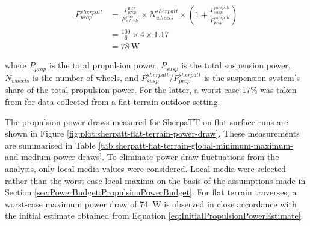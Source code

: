 \begin{align}
  \label{eq:InitialPropulsionPowerEstimate}
  P_{prop}^{sherpatt} &= \frac{P_{prop}^{mer}}{N_{wheels}^{mer}} \times N_{wheels}^{sherpatt} \times \left(1 +\frac{P_{susp}^{sherpatt}}{P_{prop}^{sherpatt}}\right) \\
           &= \frac{100}{6} \times 4 \times 1.17\\
           &= \SI{78}{\watt}
\end{align}


where $P_{prop}$ is the total propulsion power, $P_{susp}$ is the total suspension power, $N_{wheels}$ is the number of wheels, and $P_{susp}^{sherpatt} / P_{prop}^{sherpatt}$ is the suspension system's share of the total propulsion power. For the latter, a worst-case 17\% was taken from  for data collected from a flat terrain outdoor setting.

The propulsion power draws measured for SherpaTT on flat surface runs are shown in Figure \ref{fig:plot:sherpatt-flat-terrain-power-draw}. These measurements are summarised in Table \ref{tab:sherpatt-flat-terrain-global-minimum-maximum-and-medium-power-draws}. To eliminate power draw fluctuations from the analysis, only local media values were considered. Local media were selected rather than the worst-case local maxima on the basis of the assumptions made in Section \ref{sec:PowerBudget:PropulsionPowerBudget}. For flat terrain traverses, a worst-case maximum power draw of \SI{74}{\watt} is observed in close accordance with the initial estimate obtained from Equation \ref{eq:InitialPropulsionPowerEstimate}.

